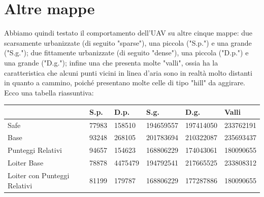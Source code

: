 \section{Altre mappe}

Abbiamo quindi testato il comportamento dell'UAV su altre cinque mappe: due scarsamente urbanizzate (di seguito "sparse"), una piccola ("S.p.") e una grande ("S.g."); due fittamente urbanizzate (di seguito "dense"), una piccola ("D.p.") e una grande ("D.g."); infine una che presenta molte "valli", ossia ha la caratteristica che alcuni punti vicini in linea d'aria sono in realtà molto distanti in quanto a cammino, poiché presentano molte celle di tipo "hill" da aggirare. Ecco una tabella riassuntiva:
\begin{center}
    \begin{tabular}{| p{4cm} | l | l | l | l | l |} \hline
                                    & \textbf{S.p.} & \textbf{D.p.} & \textbf{S.g.} & \textbf{D.g.} & \textbf{Valli}    \\ \hline
    Safe                            & 77983         & 158510        & 194659557     & 197414050     & 233762191         \\ \hline
    Base                            & 93248         & 268105        & 201783694     & 210322087     & 235693437         \\ \hline
    Punteggi Relativi               & 94657         & 154623        & 168806229     & 174043061     & 180090655         \\ \hline
    Loiter Base                     & 78878         & 4475479       & 194792541     & 217665525     & 233808312         \\ \hline
    Loiter con Punteggi Relativi    & 81199         & 179787        & 168806229     & 177287886     & 180090655         \\ \hline
    \end{tabular}
\end{center}
